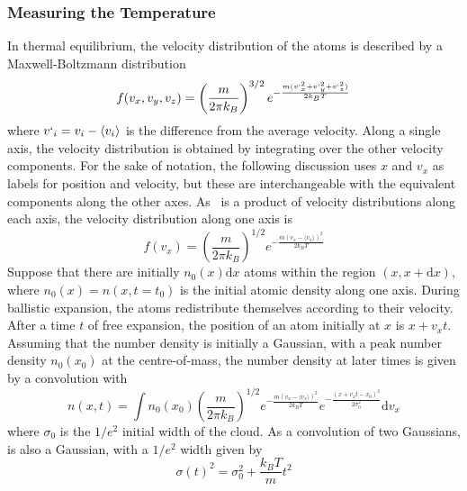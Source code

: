 \subsubsection{Measuring the Temperature}
In thermal equilibrium, the velocity distribution of the atoms is
described by a Maxwell-Boltzmann distribution
\begin{equation}
    f(v_x,v_y,v_z) = \left(\frac{m}{2\pi k_B }\right)^{3/2}e^{-\frac{m (v`_x^2+v`_y^2+v`_z^2)}{2 k_B T}}
    \label{eq:mb3D}
\end{equation}
where \(v`_i = v_i - \langle v_i \rangle\) is the difference from the
average velocity. Along a single axis, the velocity distribution is
obtained by integrating over the other velocity components. For the
sake of notation, the following discussion uses \(x\) and \(v_x\) as
labels for position and velocity, but these are interchangeable with
the equivalent components along the other axes.
As~ is a product of velocity distributions along
each axis, the velocity distribution along one axis is 
\begin{equation}
    f(v_x) = \left(\frac{m}{2\pi k_B }\right)^{1/2}e^{-\frac{m (v_x-\langle v_x \rangle) ^2}{2 k_B T}}
    \label{eq:mb1D}
\end{equation}
Suppose that there are initially \(n_0 (x) \mathrm{d}x\) atoms within
the region \((x, x+\mathrm{d}x)\), where \(n_0(x) = n(x, t=t_0)\) is
the initial atomic density along one axis. During ballistic expansion,
the atoms redistribute themselves according to their velocity. After a
time \(t\) of free expansion, the position of an atom initially at
\(x\) is \(x + v_x t\). 
Assuming that the number density is initially a Gaussian, with a peak
number density \(n_0(x_0)\) at the centre-of-mass, the number density
at later times is given by a convolution with~
\begin{equation}
        n(x,t) = \int n_0(x_0) \left(\frac{m}{2\pi k_B}\right)^{1/2} e^{-\frac{m (v_x-\langle v_x \rangle)^2}{2 k_B T}} e^{-\frac{(x+v_x t - x_0)^2}{2\sigma_0^2}} \mathrm{d}v_x
        \label{eq:density_time}
\end{equation}
where \(\sigma_0\) is the \(1/e^2\) initial width of the cloud. As a
convolution of two Gaussians,  is also a
Gaussian, with a \(1/e^2\) width given by
\begin{equation}
    \sigma(t)^2 = \sigma_0^2 + \frac{k_B T}{m} t^2
    \label{eq:expansion_width}
\end{equation}
\par\noindent
